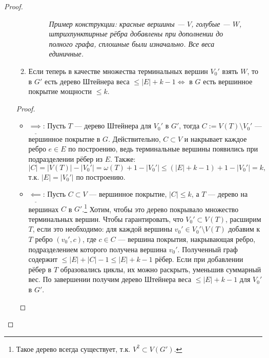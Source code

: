 \documentclass[11pt,a4paper]{report}
\def\le{\leqslant}
\theoremstyle{definition}
\theoremstyle{definition}
\theoremstyle{definition}
\begin{document}
\begin{proof}
\begin{enumerate}
\begin{enumerate}
\begin{figure}[!hbtp]
					\caption{\textit{Пример конструкции: красные вершины — $ V $, голубые — $W$, штрихпунктирные рёбра добавлены при дополнении до полного графа, сплошные были изначально. Все веса единичные. }}
				\end{figure}
				\item Если теперь в качестве множества терминальных вершин $ V_0' $ взять $ W $, то в $G'$ есть дерево Штейнера веса $ \le |E| + k - 1 \iff $ в $G$ есть вершинное покрытие мощности $\le k$.
			\end{enumerate}
			\begin{proof}$  $
				\begin{itemize}
					\item $ \underline{\implies} $: Пусть $T$ — дерево Штейнера для $V_0'$ в $G'$, тогда $C := V(T) \setminus V_0'$ — вершинное покрытие в $G$. Действительно, $ C \subset V $ и накрывает каждое ребро $e \in E$ по построению, ведь терминальные вершины появились при подразделении рёбер из $E$. Также:
					$$ |C| = |V(T)| - |V_0'| = \omega(T) + 1 - |V_0'| \le (|E| + k - 1) + 1 - |V_0'| = k,$$ т.к. $|E| = |V_0'|$ по построению. 
					\item $ \underline{\impliedby} $:  Пусть $C \subset V$ — вершинное покрытие, $|C| \le k$, а $T$ — дерево на вершинах $C$ в $G'$.\footnote{Такое дерево всегда существует, т.к. $V^2 \subset V(G')$.} Хотим, чтобы это дерево покрывало множество терминальных вершин. Чтобы гарантировать, что $V_0' \subset V(T)$, расширим $T$, если это необходимо: для каждой вершины $v_0' \in V_0' \setminus V(T)$ добавим к $T$ ребро $(v_0', c)$, где $c \in C$ — вершина покрытия, накрывающая ребро, подразделением которого получена вершина $v_0'$. Полученный граф содержит $\le |E| + |C| - 1 \le |E| + k - 1$ рёбер. Если при добавлении рёбер в $T$ образовались циклы, их можно раскрыть, уменьшив суммарный вес. По завершении получим дерево Штейнера веса $\le |E| + k - 1$ для $V_0'$ в $G'$.

\end{itemize}
\end{proof}
\end{enumerate}
\end{proof}
\end{document}
